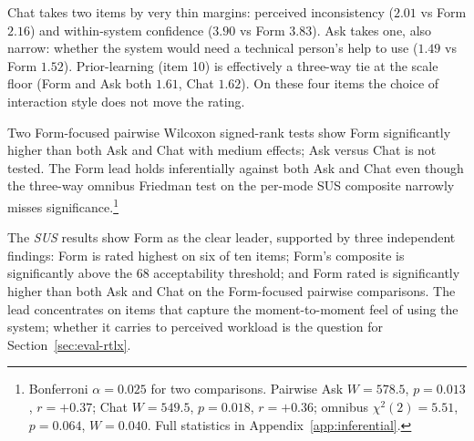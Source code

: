 Chat takes two items by very thin margins: perceived inconsistency
($2.01$ vs Form $2.16$) and within-system confidence ($3.90$ vs
Form $3.83$). Ask takes one, also narrow: whether the system would
need a technical person's help to use ($1.49$ vs Form $1.52$).
Prior-learning (item 10) is effectively a three-way tie at the
scale floor (Form and Ask both $1.61$, Chat $1.62$). On these four
items the choice of interaction style does not move the rating.

Two Form-focused pairwise Wilcoxon signed-rank tests show Form
significantly higher than both Ask and Chat with medium effects;
Ask versus Chat is not tested. The Form lead holds inferentially
against both Ask and Chat even though the three-way omnibus
Friedman test on the per-mode SUS composite narrowly misses
significance.\footnote{Bonferroni $\alpha = 0.025$ for two
comparisons. Pairwise Ask $W = 578.5$, $p = 0.013$, $r = +0.37$;
Chat $W = 549.5$, $p = 0.018$, $r = +0.36$; omnibus
$\chi^2(2) = 5.51$, $p = 0.064$, $W = 0.040$. Full statistics in
Appendix~\ref{app:inferential}.}

The \textit{SUS} results show Form as the clear leader, supported by three independent findings:
Form is rated highest on six of ten items; Form's
composite is significantly above the $68$ acceptability
threshold; and Form rated is significantly higher than both Ask and
Chat on the Form-focused pairwise comparisons. The lead
concentrates on items that capture the moment-to-moment feel of
using the system; whether it carries to perceived workload is
the question for Section~\ref{sec:eval-rtlx}.
